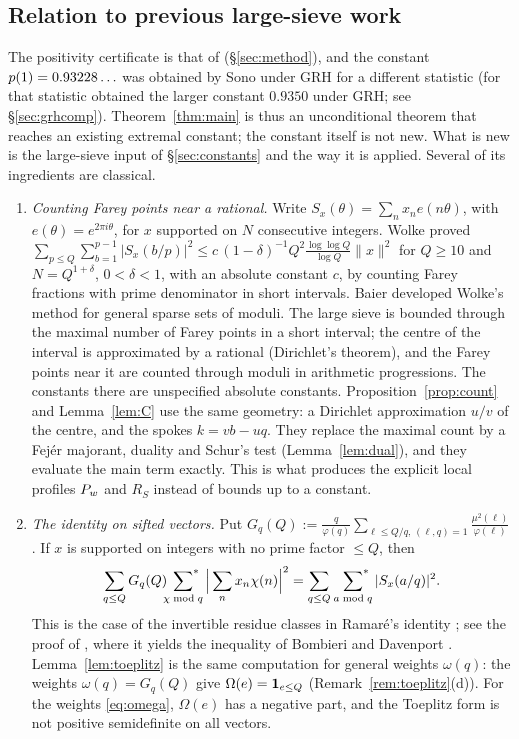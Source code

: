 \documentclass[11pt]{amsart}
\theoremstyle{definition}
\theoremstyle{remark}
\numberwithin{equation}{section}
\begin{document}
\subsection{Relation to previous large-sieve work}\label{sec:priorLS}
The positivity certificate is that of \cite{AF26,HY26} (\S\ref{sec:method}), and the constant $p(1)=0.93228\ldots$ was obtained by Sono under GRH for a different statistic \cite{Sono16} (for that statistic \cite{CGdL} obtained the larger constant $0.9350$ under GRH; see \S\ref{sec:grhcomp}). Theorem~\ref{thm:main} is thus an unconditional theorem that reaches an existing extremal constant; the constant itself is not new. What is new is the large-sieve input of \S\ref{sec:constants} and the way it is applied. Several of its ingredients are classical.
\begin{enumerate}[label=(\alph*),leftmargin=*]
\item \emph{Counting Farey points near a rational.} Write $S_x(\theta)=\sum_nx_ne(n\theta)$, with $e(\theta)=e^{2\pi i\theta}$, for $x$ supported on $N$ consecutive integers. Wolke \cite{Wol71} proved $\sum_{p\le Q}\sum_{b=1}^{p-1}|S_x(b/p)|^2\le c\,(1-\delta)^{-1}Q^2\frac{\log\log Q}{\log Q}\|x\|^2$ for $Q\ge10$ and $N=Q^{1+\delta}$, $0<\delta<1$, with an absolute constant $c$, by counting Farey fractions with prime denominator in short intervals. Baier \cite[\S4]{Bai06} developed Wolke's method for general sparse sets of moduli. The large sieve is bounded through the maximal number of Farey points in a short interval; the centre of the interval is approximated by a rational (Dirichlet's theorem), and the Farey points near it are counted through moduli in arithmetic progressions. The constants there are unspecified absolute constants. Proposition~\ref{prop:count} and Lemma~\ref{lem:C} use the same geometry: a Dirichlet approximation $u/v$ of the centre, and the spokes $k=vb-uq$. They replace the maximal count by a Fej\'er majorant, duality and Schur's test (Lemma~\ref{lem:dual}), and they evaluate the main term exactly. This is what produces the explicit local profiles $P_w$ and $R_S$ instead of bounds up to a constant.
\item \emph{The identity on sifted vectors.} Put $G_q(Q):=\frac q{\varphi(q)}\sum_{\ell\le Q/q,\,(\ell,q)=1}\frac{\mu^2(\ell)}{\varphi(\ell)}$. If $x$ is supported on integers with no prime factor $\le Q$, then
\[
\sum_{q\le Q}G_q(Q)\sideset{}{^{*}}\sum_{\chi\bmod q}\Big|\sum_nx_n\chi(n)\Big|^2=\sum_{q\le Q}\ \sideset{}{^{*}}\sum_{a\bmod q}|S_x(a/q)|^2 .
\]
This is the case of the invertible residue classes in Ramar\'e's identity \cite[Thm.~2.1]{Ram09}; see the proof of \cite[Thm.~2.3]{Ram09}, where it yields the inequality of Bombieri and Davenport \cite{BD68}. Lemma~\ref{lem:toeplitz} is the same computation for general weights $\omega(q)$: the weights $\omega(q)=G_q(Q)$ give $\Omega(e)=\mathbf 1_{e\le Q}$ (Remark~\ref{rem:toeplitz}(d)). For the weights \eqref{eq:omega}, $\Omega(e)$ has a negative part, and the Toeplitz form is not positive semidefinite on all vectors.

\end{enumerate}
\end{document}
